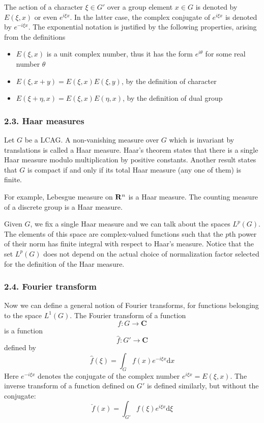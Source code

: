 The action of a character $\xi\in G'$ over a group element $x\in G$ is
denoted by $E(\xi,x)$ or even $e^{i\xi x}$.  In the latter case, the complex
conjugate of $e^{i\xi x}$ is denoted by $e^{-i\xi x}$.  The exponential
notation is justified by the following properties, arising from the
definitions

\begin{itemize}
	\item $E(\xi,x)$ is a unit complex number, thus it has the form
	$e^{i\theta}$ for some real number $\theta$
	\item $E(\xi,x+y) = E(\xi,x)E(\xi,y)$, by the definition of character
	\item $E(\xi + \eta,x) = E(\xi,x)E(\eta,x)$, by the definition of dual
	group
\end{itemize}

\subsubsection{2.3. Haar measures}

Let $G$ be a LCAG.  A non-vanishing measure over $G$ which is invariant by
translations is called a Haar measure.  Haar's theorem states that there is a
single Haar measure modulo multiplication by positive constants.  Another
result states that $G$ is compact if and only if its total Haar measure (any
one of them) is finite.

For example, Lebesgue measure on $\mathbf{R}^n$ is a Haar measure.  The
counting measure of a discrete group is a Haar measure.

Given $G$, we fix a single Haar measure and we can talk about the spaces
$L^p(G)$.  The elements of this space are complex-valued functions such that
the $p$th power of their norm has finite integral with respect to Haar's
measure.  Notice that the set $L^p(G)$ does not depend on the actual choice
of normalization factor selected for the definition of the Haar measure.

\subsubsection{2.4. Fourier transform}

Now we can define a general notion of Fourier transforms, for functions
belonging to the space $L^1(G)$.  The Fourier
transform of a function
\begin{equation}
f:G\to\mathbf{C}
\end{equation}
is a function
\begin{equation}
\hat f:G'\to\mathbf{C}
\end{equation}
defined by
\begin{equation}
\hat f(\xi) = \int_G f(x) e^{-i\xi x}\mathrm{d} x
\end{equation}
Here $e^{-i\xi x}$ denotes the conjugate of the complex number
$e^{i\xi x}=E(\xi,x)$.  The inverse transform of a function defined on $G'$ is defined similarly, but
without the conjugate:
\begin{equation}
\check f(x) = \int_{G'} f(\xi) e^{i\xi x}\mathrm{d} \xi
\end{equation}

